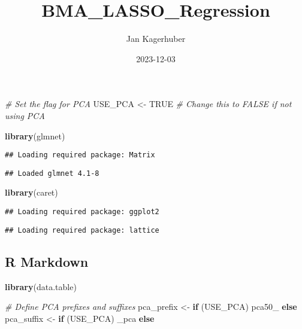 \documentclass[
]{article}
\title{BMA\_LASSO\_Regression}
\author{Jan Kagerhuber}
\date{2023-12-03}
\newenvironment{Shaded}{\begin{snugshade}}{\end{snugshade}}
\newcommand{\CommentTok}[1]{\textcolor[rgb]{0.56,0.35,0.01}{\textit{#1}}}
\newcommand{\ConstantTok}[1]{\textcolor[rgb]{0.56,0.35,0.01}{#1}}
\newcommand{\ControlFlowTok}[1]{\textcolor[rgb]{0.13,0.29,0.53}{\textbf{#1}}}
\newcommand{\FunctionTok}[1]{\textcolor[rgb]{0.13,0.29,0.53}{\textbf{#1}}}
\newcommand{\NormalTok}[1]{#1}
\newcommand{\OtherTok}[1]{\textcolor[rgb]{0.56,0.35,0.01}{#1}}
\newcommand{\StringTok}[1]{\textcolor[rgb]{0.31,0.60,0.02}{#1}}
\begin{document}
\maketitle

\begin{Shaded}
\begin{Highlighting}[]
\CommentTok{\# Set the flag for PCA}
\NormalTok{USE\_PCA }\OtherTok{\textless{}{-}} \ConstantTok{TRUE}  \CommentTok{\# Change this to FALSE if not using PCA}
\end{Highlighting}
\end{Shaded}

\begin{Shaded}
\begin{Highlighting}[]
\FunctionTok{library}\NormalTok{(glmnet)}
\end{Highlighting}
\end{Shaded}

\begin{verbatim}
## Loading required package: Matrix
\end{verbatim}

\begin{verbatim}
## Loaded glmnet 4.1-8
\end{verbatim}

\begin{Shaded}
\begin{Highlighting}[]
\FunctionTok{library}\NormalTok{(caret)}
\end{Highlighting}
\end{Shaded}

\begin{verbatim}
## Loading required package: ggplot2
\end{verbatim}

\begin{verbatim}
## Loading required package: lattice
\end{verbatim}

\hypertarget{r-markdown}{%
\subsection{R Markdown}\label{r-markdown}}

\begin{Shaded}
\begin{Highlighting}[]
\FunctionTok{library}\NormalTok{(data.table)}

\CommentTok{\# Define PCA prefixes and suffixes}
\NormalTok{pca\_prefix }\OtherTok{\textless{}{-}} \ControlFlowTok{if}\NormalTok{ (USE\_PCA) }\StringTok{\textquotesingle{}pca50\_\textquotesingle{}} \ControlFlowTok{else} \StringTok{\textquotesingle{}\textquotesingle{}}
\NormalTok{pca\_suffix }\OtherTok{\textless{}{-}} \ControlFlowTok{if}\NormalTok{ (USE\_PCA) }\StringTok{\textquotesingle{}\_pca\textquotesingle{}} \ControlFlowTok{else} \StringTok{\textquotesingle{}\textquotesingle{}}
\end{Highlighting}
\end{Shaded}
\end{document}
